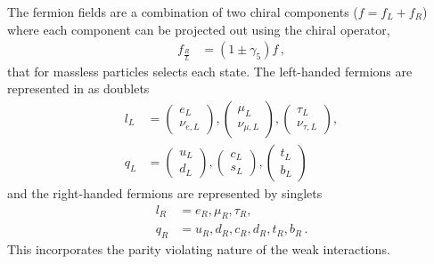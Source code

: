 The fermion fields are a combination of two chiral components ($f = f_L + f_R$)
where each component can be projected out using the chiral operator,
\begin{align}
f_{\frac{R}{L}} &= \left(1\pm\gamma_5\right) f \, ,
\end{align}
that for massless particles selects each state.
The left-handed fermions are represented in \grpsutw as doublets 
\begin{align}
l_L &= \begin{pmatrix}e_L\\\nu_{e,L}\end{pmatrix},\begin{pmatrix}\mu_L\\\nu_{\mu,L} 
\end{pmatrix},\begin{pmatrix}\tau_L\\\nu_{\tau,L}\end{pmatrix},    \\
q_L &= \begin{pmatrix}u_L\\d_L\end{pmatrix},\begin{pmatrix}c_L\\s_L\end{pmatrix},\begin{pmatrix}t_L\\b_L\end{pmatrix}   
\end{align}
and the right-handed fermions are represented by \grpsutw singlets
\begin{align}
l_R &= e_R, \mu_R, \tau_R, \\
q_R &= u_R, d_R, c_R, d_R, t_R, b_R \, .
\end{align}
This incorporates the parity violating nature of the weak interactions.

